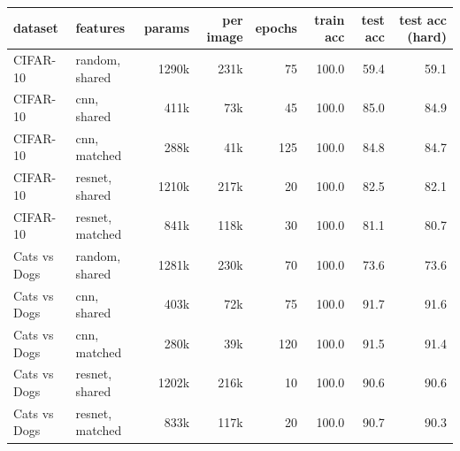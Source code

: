 \begin{tabular}{llrrrrrr}
\toprule
dataset & features & params & per image & epochs & train acc & test acc & test acc (hard) \\
\midrule
CIFAR-10 & random, shared & 1290k & 231k & 75 & 100.0 & 59.4 & 59.1 \\
CIFAR-10 & cnn, shared & 411k & 73k & 45 & 100.0 & 85.0 & 84.9 \\
CIFAR-10 & cnn, matched & 288k & 41k & 125 & 100.0 & 84.8 & 84.7 \\
CIFAR-10 & resnet, shared & 1210k & 217k & 20 & 100.0 & 82.5 & 82.1 \\
CIFAR-10 & resnet, matched & 841k & 118k & 30 & 100.0 & 81.1 & 80.7 \\
\midrule
Cats vs Dogs & random, shared & 1281k & 230k & 70 & 100.0 & 73.6 & 73.6 \\
Cats vs Dogs & cnn, shared & 403k & 72k & 75 & 100.0 & 91.7 & 91.6 \\
Cats vs Dogs & cnn, matched & 280k & 39k & 120 & 100.0 & 91.5 & 91.4 \\
Cats vs Dogs & resnet, shared & 1202k & 216k & 10 & 100.0 & 90.6 & 90.6 \\
Cats vs Dogs & resnet, matched & 833k & 117k & 20 & 100.0 & 90.7 & 90.3 \\
\bottomrule
\end{tabular}
